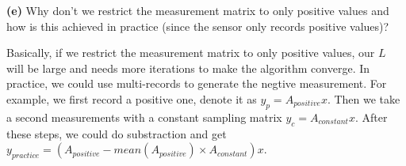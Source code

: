 \documentclass[11pt]{article}
\begin{document}
    \textbf{(e)} Why don't we restrict the measurement matrix to only
positive values and how is this achieved in practice (since the sensor
only records positive values)?

    Basically, if we restrict the measurement matrix to only positive
values, our \(L\) will be large and needs more iterations to make the
algorithm converge. In practice, we could use multi-records to generate
the negtive measurement. For example, we first record a positive one,
denote it as \(y_p = A_{positive}x\). Then we take a second measurements
with a constant sampling matrix \(y_c = A_{constant}x\). After these
steps, we could do substraction and get
\(y_{practice} = (A_{positive}-mean(A_{positive})\times A_{constant})x\).


    
    
    
    
\end{document}
